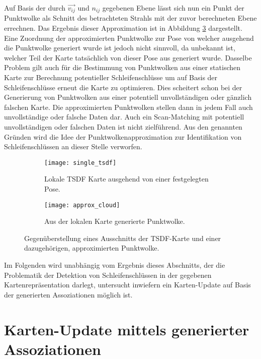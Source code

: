 Auf Basis der durch $\vec{v_{ij}}$ und $n_{ij}$ gegebenen Ebene lässt sich nun ein Punkt der Punktwolke als Schnitt des betrachteten Strahls mit der zuvor berechneten Ebene errechnen. Das Ergebnis dieser Approximation ist in Abbildung \ref{fig:pointcloud_approximation} dargestellt. Eine Zuordnung der approximierten Punktwolke zur Pose von welcher ausgehend die Punktwolke generiert wurde ist jedoch nicht sinnvoll, da unbekannt ist, welcher Teil der Karte tatsächlich von dieser Pose aus generiert wurde. Dasselbe Problem gilt auch für die Bestimmung von Punktwolken aus einer statischen Karte zur Berechnung potentieller Schleifenschlüsse um auf Basis der Schleifenschlüsse erneut die Karte zu optimieren. Dies scheitert schon bei der Generierung von Punktwolken aus einer potentiell unvollständigen oder gänzlich falschen Karte. Die approximierten Punktwolken stellen dann in jedem Fall auch unvollständige oder falsche Daten dar. Auch ein Scan-Matching mit potentiell unvollständigen oder falschen Daten ist nicht zielführend. Aus den genannten Gründen wird die Idee der Punktwolkenapproximation zur Identifikation von Schleifenschlüssen an dieser Stelle verworfen.

\begin{figure}
	\centering
	\begin{subfigure}{.5\textwidth}
 		 \centering
  		 \texttt{[image: single\_tsdf]}
  		 \centering \caption{Lokale TSDF Karte ausgehend von einer festgelegten Pose.}
  		 \label{fig:single_tsdf}
	\end{subfigure}%
	\begin{subfigure}{.5\textwidth}
    	\centering
  		\texttt{[image: approx\_cloud]}
  		\centering \caption{Aus der lokalen Karte generierte Punktwolke.}
  		\label{fig:approx_cloud}
	\end{subfigure}
	\caption{Gegenüberstellung eines Ausschnitts der TSDF-Karte und einer dazugehörigen, approximierten Punktwolke.}
	\label{fig:pointcloud_approximation}
\end{figure}

Im Folgenden wird unabhängig vom Ergebnis dieses Abschnitts, der die Problematik der Detektion von Schleifenschlüssen in der gegebenen Kartenrepräsentation darlegt, untersucht inwiefern ein Karten-Update auf Basis der generierten Assoziationen möglich ist.

 
\section{Karten-Update mittels generierter Assoziationen}

